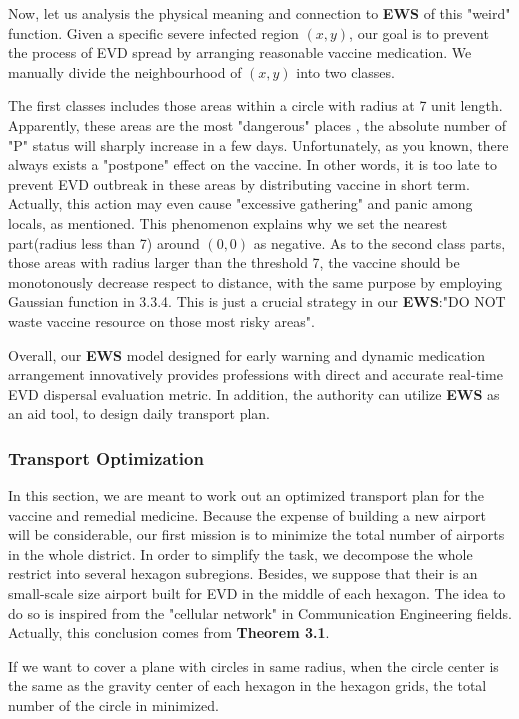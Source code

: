 Now, let us analysis the physical meaning and connection to \textbf{EWS} of this "weird" function. Given a specific severe infected region $(x,y)$, our goal is to prevent the process of EVD spread by arranging reasonable vaccine medication. We manually divide the neighbourhood of $(x,y)$ into two classes. 

The first classes includes those areas within a circle with radius at 7 unit length. Apparently, these areas are the most "dangerous" places , the absolute number of "P" status will sharply increase in a few days. Unfortunately, as you known, there always exists a "postpone" effect on the vaccine. In other words, it is too late to prevent EVD outbreak in these areas by distributing vaccine in short term. Actually, this action may even cause "excessive gathering" and panic among locals, as \cite{ungar1998hot} mentioned. This phenomenon explains why we set the nearest part(radius less than 7) around $(0,0)$ as negative. As to the second class parts, those areas with radius larger than the threshold 7, the vaccine should be monotonously decrease respect to distance, with the same purpose by employing Gaussian function in 3.3.4. This is just a crucial strategy in our \textbf{EWS}:"DO NOT waste vaccine resource on those most risky areas".

Overall, our \textbf{EWS} model designed for early warning and dynamic medication arrangement innovatively provides professions with direct and accurate real-time EVD dispersal evaluation metric. In addition, the authority can utilize \textbf{EWS} as an aid tool, to design daily transport plan.
 
\subsubsection{Transport Optimization}
In this section, we are meant to work out an optimized transport plan for the vaccine and remedial medicine. Because the expense of building a new airport will be considerable, our first mission is to minimize the total number of airports in the whole district. In order to simplify the task, we decompose the whole restrict into several hexagon subregions. Besides, we suppose that their is an small-scale size airport built for EVD in the middle of each hexagon. The idea to do so is inspired from the "cellular network" in Communication Engineering fields. Actually, this conclusion comes from \textbf{Theorem 3.1}.

\begin{Theorem} \label{thm:1}
    If we want to cover a plane with circles in same radius, when the circle center is the same as the gravity center of each hexagon in the hexagon grids, the total number of the circle in minimized.
\end{Theorem}

